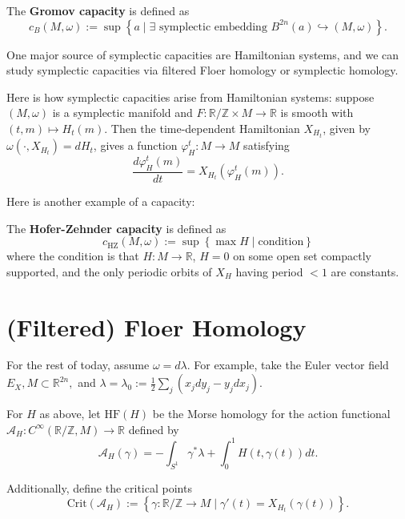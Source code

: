 \begin{example}

The \textbf{Gromov capacity} is defined as
\[
c_B(M,\omega) := \sup \left\{ a\mid  \exists \text{ symplectic embedding } B^{2n}(a) \hookrightarrow (M, \omega) \right\}.
\]

\end{example}

One major source of symplectic capacities are Hamiltonian systems, and we can study symplectic capacities via filtered Floer homology or symplectic homology.

Here is how symplectic capacities arise from Hamiltonian systems: suppose $(M,\omega)$ is a symplectic manifold and $F:\mathbb{R}/\mathbb{Z}\times M \to \mathbb{R}$ is smooth with $(t,m) \mapsto H_t(m)$. Then the time-dependent Hamiltonian $X_{H_t}$, given by $\omega(\cdot, X_{H_t}) =dH_t$, gives a function $\varphi_H^t: M\to M$ satisfying
\[
\dfrac{d\varphi_H^t (m)}{dt} = X_{H_t}(\varphi_H^t(m)).
\]

Here is another example of a capacity:

\begin{example}

The \textbf{Hofer-Zehnder capacity} is defined as
\[
c_{\text{HZ}}(M, \omega) := \sup \left\{ \max H \mid  \text{condition}\right\}
\]
where the condition is that $H:M\to \mathbb{R}$, $H=0$ on some open set compactly supported, and the only periodic orbits of $X_H$ having period $<1$ are constants.

\end{example}

\section{(Filtered) Floer Homology}

For the rest of today, assume $\omega=d\lambda$. For example, take the Euler vector field $E_X, M\subset \mathbb{R}^{2n},$ and $\lambda = \lambda_0 := \frac{1}{2}\sum_j (x_j dy_j - y_j dx_j)$.

For $H$ as above, let $\text{HF}(H)$ be the Morse homology for the action functional $\mathcal{A}_H: C^\infty (\mathbb{R}/\mathbb{Z}, M)\to \mathbb{R}$ defined by
\[
\mathcal{A}_H(\gamma)=-\int_{S^1} \gamma^* \lambda+\int_0^1 H(t, \gamma(t)) dt.
\]

Additionally, define the critical points
\[
\text{Crit}(\mathcal{A}_H):=\left\{ \gamma: \mathbb{R}/\mathbb{Z} \to M \mid \gamma'(t)=X_{H_t}(\gamma(t)) \right\}.
\]

